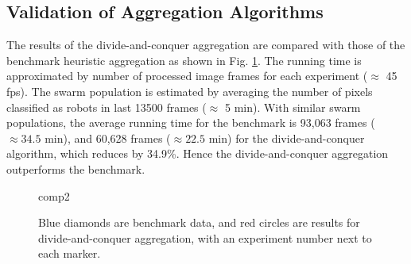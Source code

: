 \subsection{Validation of Aggregation Algorithms}
The results of the divide-and-conquer aggregation are compared with those of the benchmark heuristic aggregation as shown in Fig. \ref{fig:Exptcomp}. The running time is approximated by number of processed image frames for each experiment ($\approx$ 45 fps). The swarm population is estimated by averaging the number of pixels classified as robots in last 13500 frames ($\approx$ 5 min). With similar swarm populations, the average running time for the benchmark is 93,063 frames ($\approx 34.5$ min), and 60,628 frames ($\approx 22.5$ min) for the divide-and-conquer algorithm, which reduces by 34.9\%. Hence the divide-and-conquer aggregation outperforms the benchmark. 
      \begin{figure}[h]
      	\vspace{-3 mm}
      	\centering      	\begin{overpic}[width=0.7\columnwidth]{comp2}
      	\end{overpic}
      	
      	\caption{\label{fig:Exptcomp} Blue diamonds are benchmark data, and red circles are results for divide-and-conquer aggregation, with an experiment number next to each marker.} 
      \end{figure}
      
      